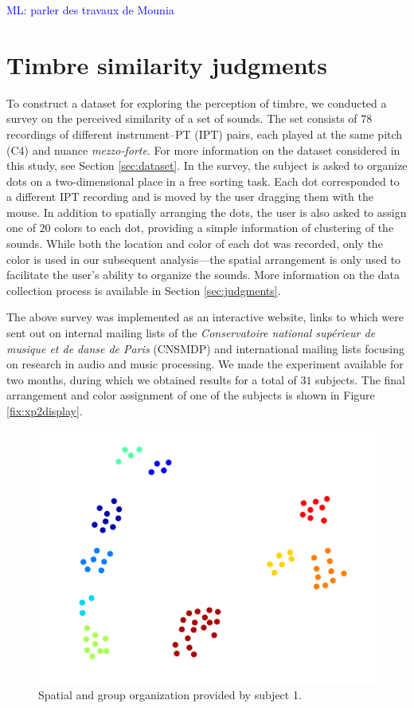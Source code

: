 \documentclass{bmcart}
\newcommand{\ml}[1]{\textcolor{blue}{ML: #1}}
\begin{document}
\ml{parler des travaux de Mounia}


\section*{Timbre similarity judgments}
\label{sec:survey}

To construct a dataset for exploring the perception of timbre, we conducted a survey on the perceived similarity of a set of sounds.
The set consists of $78$ recordings of different instrument--PT (IPT) pairs, each played at the same pitch (C4) and nuance \textit{mezzo-forte}. For more information on the dataset considered in this study, see Section \ref{sec:dataset}.
In the survey, the subject is asked to organize dots on a two-dimensional place in a free sorting task.
Each dot corresponded to a different IPT recording and is moved by the user dragging them with the mouse.
In addition to spatially arranging the dots, the user is also asked to assign one of $20$ colors to each dot, providing a simple information of clustering of the sounds.
While both the location and color of each dot was recorded, only the color is used in our subsequent analysis---the spatial arrangement is only used to facilitate the user's ability to organize the sounds.
More information on the data collection process is available in  Section \ref{sec:judgments}.

The above survey was implemented as an interactive website, links to which were sent out on internal mailing lists of the \emph{Conservatoire national sup\'erieur de musique et de danse de Paris} (CNSMDP) and international mailing lists focusing on research in audio and music processing.
We made the experiment available for two months, during which we obtained results for a total of $31$ subjects.
The final arrangement and color assignment of one of the subjects is shown in Figure \ref{fix:xp2display}.

\begin{figure}
\center
\includegraphics[width = \textwidth]{figures/xp2example1.png}
\caption{Spatial and group organization provided by subject 1.}
\label{fig:xp2display}
\end{figure}
\end{document}
